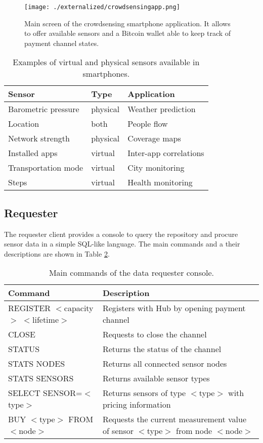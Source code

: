 \begin{figure}
 \centering
 \texttt{[image: ./externalized/crowdsensingapp.png]}
 \caption{Main screen of the crowdsensing smartphone application. It allows to offer available sensors and a Bitcoin wallet able to keep track of payment channel states.}
 \label{fig:crowdsensingapp}
 \end{figure}

\begin{table}
  \centering
  \begin{tabularx}{\textwidth}{ l  l  X  }
    \toprule
    Sensor & Type & Application \\
    \midrule
    Barometric pressure & physical & Weather prediction \\ 
    Location & both & People flow  \\ 
    Network strength & physical & Coverage maps \\  
    Installed apps & virtual & Inter-app correlations    \\  
    Transportation mode & virtual & City monitoring \\ 
    Steps & virtual & Health monitoring  \\
    \bottomrule
  \end{tabularx}
  \caption{Examples of virtual and physical sensors available in smartphones.}
  \label{tbl:sensors}
\end{table}

\subsection{Requester}

The requester client provides a console to query the repository and procure sensor data in a simple \ac{SQL}-like language. The main commands and a their descriptions are shown in Table \ref{tbl:commands}. 

\begin{table}\footnotesize
  \centering
    \begin{tabularx}{\textwidth}{ l X }
    \toprule
    Command & Description \\
    \midrule
    REGISTER $<$capacity$>$ $<$lifetime$>$ & Registers with Hub by opening payment channel \\
    CLOSE & Requests to close the channel \\
    STATUS & Returns the status of the channel \\
    STATS NODES & Returns all connected sensor nodes \\
    STATS SENSORS & Returns available sensor types \\
    SELECT SENSOR=$<$type$>$ & Returns sensors of type $<$type$>$ with pricing information \\
    BUY $<$type$>$ FROM $<$node$>$ & Requests the current measurement value of sensor $<$type$>$ from node $<$node$>$ \\
   \bottomrule
  \end{tabularx}
  \caption{Main commands of the data requester console.}
  \label{tbl:commands}
\end{table} 


